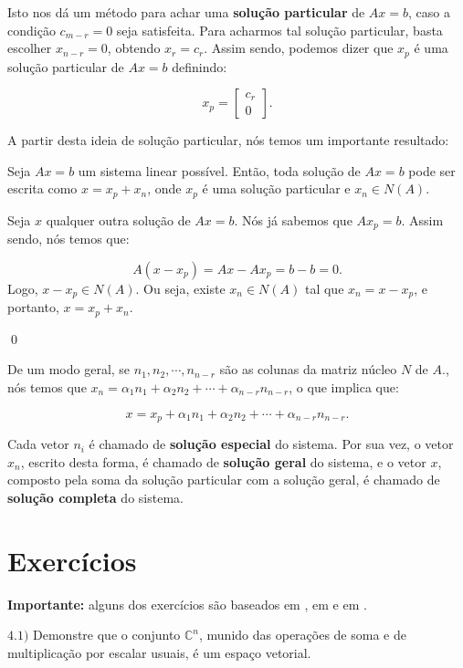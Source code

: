 Isto nos dá um método para achar uma \textbf{solução particular} de $Ax = b$, caso a condição $c_{m - r} = 0$ seja satisfeita. Para acharmos tal solução particular, basta escolher $x_{n - r} = 0$, obtendo $x_{r} = c_{r}$. Assim sendo, podemos dizer que $x_{p}$ é uma solução particular de $Ax = b$ definindo:

$$
x_{p} = \begin{bmatrix}
	c_{r} \\
	0
\end{bmatrix}.
$$

A partir desta ideia de solução particular, nós temos um importante resultado:

\begin{Theorem}
	Seja $Ax = b$ um sistema linear possível. Então, toda solução de $Ax = b$ pode ser escrita como $x = x_p + x_n$, onde $x_p$ é uma solução particular e $x_n\in N(A)$.
\end{Theorem}

\begin{Proof}
	Seja $x$ qualquer outra solução de $Ax = b$. Nós já sabemos que $Ax_p = b$. Assim sendo, nós temos que:
	
	$$
	A(x - x_p) = Ax - Ax_p = b - b = 0.
	$$
	Logo, $x - x_p\in N(A)$. Ou seja, existe $x_n\in N(A)$ tal que $x_n = x - x_p$, e portanto, $x = x_p + x_n$.
	
	\qed
\end{Proof}

De um modo geral, se $n_1, n_2, \cdots, n_{n - r}$ são as colunas da matriz núcleo $N$ de $A$., nós temos que $x_n = \alpha_1 n_1 + \alpha_2 n_2 + \cdots + \alpha_{n - r} n_{n - r}$, o que implica que:

$$
x = x_p + \alpha_1 n_1 + \alpha_2 n_2 + \cdots + \alpha_{n - r} n_{n - r}.
$$

Cada vetor $n_i$ é chamado de \textbf{solução especial} do sistema. Por sua vez, o vetor $x_n$, escrito desta forma, é chamado de \textbf{solução geral} do sistema, e o vetor $x$, composto pela soma da solução particular com a solução geral, é chamado de \textbf{solução completa} do sistema.

\section{Exercícios}

\textbf{Importante:} alguns dos exercícios são baseados em \cite{lista1doguilherme}, em \cite{slide4doyuri} e em \cite{axler2026}.

\noindent $\mathbf{4.1)}$ Demonstre que o conjunto $\mathbb{C}^n$, munido das operações de soma e de multiplicação por escalar usuais, é um espaço vetorial.


